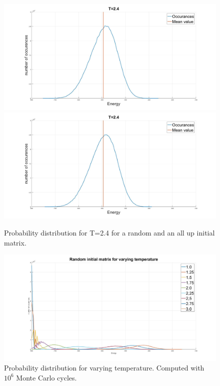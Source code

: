 \documentclass[10pt,a4paper]{article}
\begin{document}
\begin{figure}
\centerline{
\includegraphics[scale=0.15]{OccurancesRandom.jpg}
\includegraphics[scale=0.15]{OccurancesUp.jpg}
}
\caption{Probability distribution for T=2.4 for a random and an all up initial matrix.}
\label{fig:ProbBoth}
\end{figure}

\begin{figure} [H]
\centerline{
\includegraphics[scale=0.30]{ProbabilityRandom.jpg}
}
\caption{Probability distribution for varying temperature. Computed with $10^6$ Monte Carlo cycles.}
\label{fig:Probability}
\end{figure}
\end{document}
